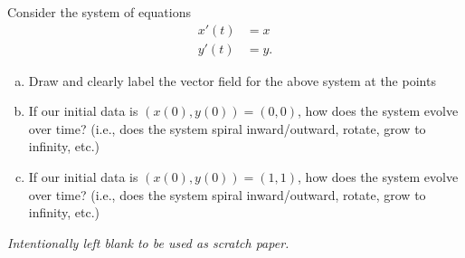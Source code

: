 \documentclass[12pt]{amsbook}
\begin{document}
Consider the system of equations 
\begin{align*}
x'(t) &= x\\
y'(t) &= y.
\end{align*}
\vspace*{.5cm}
\begin{enumerate}[(a)]
    \item Draw and clearly label the vector field for the above system at the points 
    \begin{center}
    \begin{Parallel}{0.45\textwidth}{0.45\textwidth}
\ParallelPar
\end{Parallel}
    \end{center}
    \begin{center}
    \end{center}
    
    \item If our initial data is $(x(0),y(0))=(0,0)$, how does the system evolve over time? (i.e., does the system spiral inward/outward, rotate, grow to infinity, etc.)
    \vspace*{4cm}
    \item If our initial data is $(x(0),y(0))=(1,1)$, how does the system evolve over time? (i.e., does the system spiral inward/outward, rotate, grow to infinity, etc.)
\end{enumerate}

    
    \newpage
\emph{Intentionally left blank to be used as scratch paper.}\\
\end{document}
